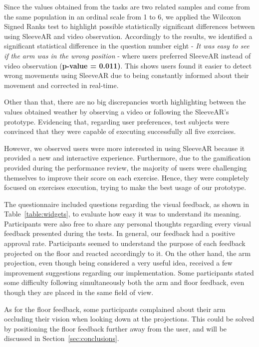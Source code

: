 Since the values obtained from the tasks are two related samples and come from the same population in
an ordinal scale from 1 to 6, we applied the Wilcoxon Signed Ranks test to highlight possible statistically significant
differences between using SleeveAR and video observation. Accordingly to the results, we identified a significant statistical difference in the question number eight - \textit{It was easy to see if the arm was in the wrong position} - where users preferred SleeveAR instead of video observation (\textbf{p-value = 0.011)}. This shows users found it easier to detect wrong movements using SleeveAR due to being constantly informed about their movement and corrected in real-time. 

Other than that, there are no big discrepancies worth highlighting between the values obtained weather by observing a video or following the SleeveAR's prototype.
Evidencing that, regarding user preferences, test subjects were convinced that they were capable of executing successfully all five exercises. 

However, we observed users were more interested in using SleeveAR because it provided a new and interactive experience. 
Furthermore, due to the gamification provided during the performance review, the majority of users were challenging themselves to improve their score on each exercise. Hence, they were completely focused on exercises execution, trying to make the best usage of our prototype.

The questionnaire included questions regarding the visual feedback, as shown in Table~\ref{table:widgets}, to evaluate how easy it was to understand its meaning. Participants were also free to share any personal thoughts regarding every visual feedback presented during the tests.
In general, our feedback had a positive approval rate. Participants seemed to understand the purpose of each feedback projected on the floor and reacted accordingly to it. 
On the other hand, the arm projection, even though being considered a very useful idea, received a few improvement suggestions regarding our implementation. Some participants stated some difficulty following simultaneously both the arm and floor feedback, even though they are placed in the same field of view.

As for the floor feedback, some participants complained about their arm occluding their vision when looking down at the projections. 
This could be solved by positioning the floor feedback further away from the user, and will be discussed in Section~\ref{sec:conclusions}.

